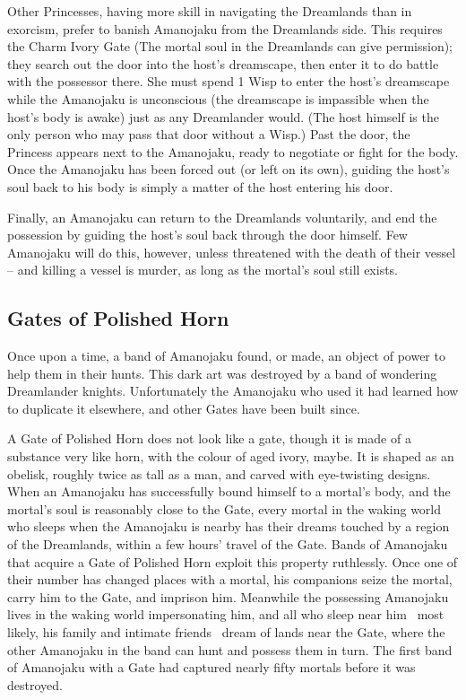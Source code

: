 Other Princesses, having more skill in navigating the Dreamlands than in exorcism, prefer to banish Amanojaku from the Dreamlands side. This requires the Charm Ivory Gate (The mortal soul in the Dreamlands can give permission); they search out the door into the host's dreamscape, then enter it to do battle with the possessor there. She must spend 1 Wisp to enter the host's dreamscape while the Amanojaku is unconscious (the dreamscape is impassible when the host's body is awake) just as any Dreamlander would. (The host himself is the only person who may pass that door without a Wisp.) Past the door, the Princess appears next to the Amanojaku, ready to negotiate or fight for the body. Once the Amanojaku has been forced out (or left on its own), guiding the host's soul back to his body is simply a matter of the host entering his door. 

Finally, an Amanojaku can return to the Dreamlands voluntarily, and end the possession by guiding the host's soul back through the door himself. Few Amanojaku will do this, however, unless threatened with the death of their vessel -- and killing a vessel is murder, as long as the mortal's soul still exists. 

\subsection*{Gates of Polished Horn}
Once upon a time, a band of Amanojaku found, or made, an object of power to help them in their hunts.  This dark art was destroyed by a band of wondering Dreamlander knights.  Unfortunately the Amanojaku who used it had learned how to duplicate it elsewhere, and other Gates have been built since.

A Gate of Polished Horn does not look like a gate, though it is made of a substance very like horn, with the colour of aged ivory, maybe. It is shaped as an obelisk, roughly twice as tall as a man, and carved with eye-twisting designs. When an Amanojaku has successfully bound himself to a mortal's body, and the mortal's soul is reasonably close to the Gate, every mortal in the waking world who sleeps when the Amanojaku is nearby has their dreams touched by a region of the Dreamlands, within a few hours' travel of the Gate.  Bands of Amanojaku that acquire a Gate of Polished Horn exploit this property ruthlessly.  Once one of their number has changed places with a mortal, his companions seize the mortal, carry him to the Gate, and imprison him.  Meanwhile the possessing Amanojaku lives in the waking world impersonating him, and all who sleep near him \textendash\, most likely, his family and intimate friends \textendash\, dream of lands near the Gate, where the other Amanojaku in the band can hunt and possess 
them  in turn.  The first band of Amanojaku with a Gate had captured nearly fifty mortals before it was destroyed. 


